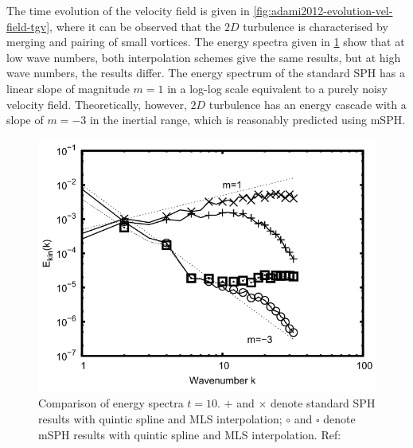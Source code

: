 The time evolution of the velocity field is given in \ref{fig:adami2012-evolution-vel-field-tgv}, where it can be observed that the $2D$ turbulence is characterised by merging and pairing of small vortices. The energy spectra given in \ref{fig:adami2012-energy-spectra-tgv} show that at low wave numbers, both interpolation schemes give the same results, but at high wave numbers, the results differ. The energy spectrum of the standard SPH has a linear slope of magnitude $m = 1$ in a log-log scale equivalent to a purely noisy velocity field. Theoretically, however, $2D$ turbulence has an energy cascade with a slope of $m = -3$ in the inertial range, which is reasonably predicted using mSPH.
\begin{figure}[h]
    \centering
    \includegraphics[scale=0.6]{Figures/research_papers/adami2012-energy-spectra-tgv.png}
    \caption{Comparison of energy spectra $t=10$. $+$ and $\times$ denote standard SPH results with quintic spline and MLS interpolation; $\circ$ and $\square$ denote mSPH results with quintic spline and MLS interpolation. Ref: \parencite{Adami2012} }
    \label{fig:adami2012-energy-spectra-tgv}
\end{figure}

